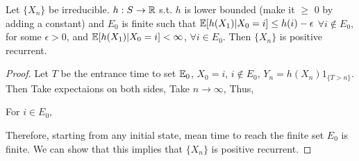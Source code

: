 \documentclass[all-lectures.tex]{subfiles}
\begin{document}
\begin{thm}
\label{thm1}
Let  $\{X_n\}$  be irreducible. $h:S \to \mathbb{R}$ s.t. $h$ is lower bounded (make it $\ge$ 0 by adding a constant) and $E_0$ is finite such that $\mathbb{E}[h(X_1)|X_0=i] \le h(i) - \epsilon$ \quad $\forall i \notin E_0$,  for some $\epsilon >0$, and $\mathbb{E}[h(X_1)|X_0=i] < \infty$, \quad $\forall i \in E_0$. Then $\{X_n\}$ is positive recurrent.
\end{thm}
\begin{proof}
Let $T$ be the entrance time to set $\mathbb{E}_0$, $X_0 = i$, $i \notin E_0$, $Y_n = h(X_n) 1_{\{T>n\}}$. 
Then
Take expectaions on both sides,
Take $n \to \infty$,
Thus,

For $i \in E_0$, 

Therefore, starting from any initial state, mean time to reach the finite set $E_0$ is finite.
We can show that this implies that $\{X_n\}$ is positive recurrent.
\end{proof}
\end{document}
